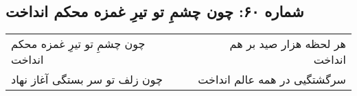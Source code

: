 \begin{center}
\section*{شماره ۶۰: چون چشمِ تو تیرِ غمزه محکم انداخت}
\label{sec:060}
\begin{longtable}{l p{0.5cm} r}
چون چشمِ تو تیرِ غمزه محکم انداخت
&&
هر لحظه هزار صید بر هم انداخت
\\
چون زلف تو سر بستگی آغاز نهاد
&&
سرگشتگیی در همه عالم انداخت
\\
\end{longtable}
\end{center}
